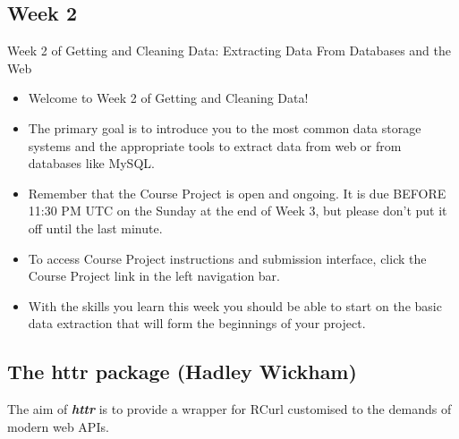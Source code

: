 
\newpage
\subsection*{Week 2} 
Week 2 of Getting and Cleaning Data: Extracting Data From Databases and the Web

\begin{itemize}
\item Welcome to Week 2 of Getting and Cleaning Data! 

\item The primary goal is to introduce you to the most common data storage systems and the appropriate tools to extract data from web or from databases like MySQL. 

\item Remember that the Course Project is open and ongoing. It is due BEFORE 11:30 PM UTC on the Sunday at the end of Week 3, but please don't put it off until the last minute. 
\item To access Course Project instructions and submission interface, click the Course Project link in the left navigation bar.  


\item With the skills you learn this week you should be able to start on the basic data extraction that will form the beginnings of your project.
\end{itemize} 
\newpage
\subsection*{The httr package (Hadley Wickham)}
The aim of \textbf{\textit{httr}} is to provide a wrapper for RCurl customised to the demands of modern web APIs.

